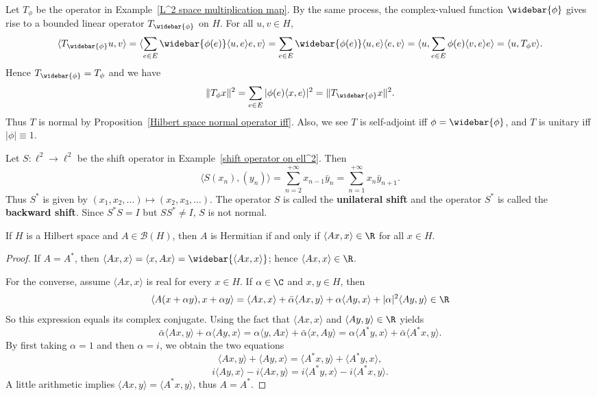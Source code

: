 \begin{example}
Let $T_{\phi}$ be the operator in Example~\ref{L^2 space multiplication map}. By the same process, the complex-valued function $\widebar{\phi}$ gives rise to a bounded linear operator $T_{\widebar{\phi}}$ on $H$. For all $u,v\in H$,
\[\langle T_{\widebar{\phi}}u,v\rangle=\langle\sum_{e\in E}\widebar{\phi(e)}\langle u,e\rangle e,v\rangle=\sum_{e\in E}\widebar{\phi(e)}\langle u,e\rangle\langle e,v\rangle=\langle u,\sum_{e\in E}\phi(e)\langle v,e\rangle e\rangle=\langle u,T_\phi v\rangle.\]
Hence $T_{\widebar{\phi}}=T_\phi$ and we have
\[\|T_\phi x\|^2=\sum_{e\in E}|\phi(e)\langle x,e\rangle|^2=\|T_{\widebar{\phi}}x\|^2.\]
Thus $T$ is normal by Proposition~\ref{Hilbert space normal operator iff}. Also, we see $T$ is self-adjoint iff $\phi=\widebar{\phi}$, and $T$ is unitary iff $|\phi|\equiv 1$. 
\end{example}
\begin{example}
Let $S:\ell^2\to\ell^2$ be the shift operator in Example~\ref{shift operator on ell^2}. Then
\[\langle S(x_n),(y_n)\rangle=\sum_{n=2}^{+\infty}x_{n-1}\bar{y}_n=\sum_{n=1}^{+\infty}x_n\bar{y}_{n+1}.\]
Thus $S^*$ is given by $(x_1,x_2,\dots)\mapsto(x_2,x_3,\dots)$. The operator $S$ is called the \textbf{unilateral shift} and the operator $S^*$ is called the \textbf{backward shift}. Since $S^*S=I$ but $SS^*\neq I$, $S$ is not normal.
\end{example}
\begin{proposition}\label{Hilbert space Hermitian iff}
If $H$ is a Hilbert space and $A\in\mathcal{B}(H)$, then $A$ is Hermitian if and only if $\langle Ax,x\rangle\in\R$ for all $x\in H$.
\end{proposition}
\begin{proof}
If $A=A^*$, then $\langle Ax,x\rangle=\langle x,Ax\rangle=\widebar{\langle Ax,x\rangle}$; hence $\langle Ax,x\rangle\in\R$.\par
For the converse, assume $\langle Ax,x\rangle$ is real for every $x\in H$. If $\alpha\in\C$ and $x,y\in H$, then
\[\langle A(x+\alpha y),x+\alpha y\rangle=\langle Ax,x\rangle+\bar{\alpha}\langle Ax,y\rangle+\alpha\langle Ay,x\rangle+|\alpha|^2\langle Ay,y\rangle\in\R\]
So this expression equals its complex conjugate. Using the fact that $\langle Ax,x\rangle$ and $\langle Ay,y\rangle\in\R$ yields
\[\bar{\alpha}\langle Ax,y\rangle+\alpha\langle Ay,x\rangle=\alpha\langle y,Ax\rangle+\bar{\alpha}\langle x,Ay\rangle=\alpha\langle A^*y,x\rangle+\bar{\alpha}\langle A^*x,y\rangle.\]
By first taking $\alpha=1$ and then $\alpha=i$, we obtain the two equations
\[\langle Ax,y\rangle+\langle Ay,x\rangle=\langle A^*x,y\rangle+\langle A^*y,x\rangle,\]
\[i\langle Ay,x\rangle-i\langle Ax,y\rangle=i\langle A^*y,x\rangle-i\langle A^*x,y\rangle.\]
A little arithmetic implies $\langle Ax,y\rangle=\langle A^*x,y\rangle$, thus $A=A^*$.
\end{proof}
